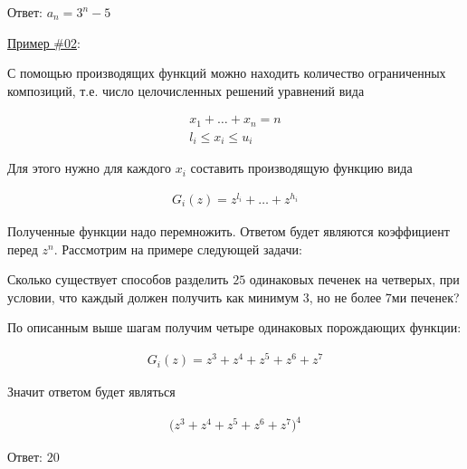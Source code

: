 Ответ: \(a_{n} = 3^{n} - 5\)

\underline{Пример \#02}:

С помощью производящих функций можно находить количество ограниченных
композиций, т.е. число целочисленных решений уравнений вида

\begin{align*}
  x_{1} + \dotsc + x_{n} = n \\
  l_{i} \le x_{i} \le u_{i}
\end{align*}

Для этого нужно для каждого \(x_{i}\) составить производящую функцию вида

\begin{align*}
  G_{i}(z) = z^{l_{i}} + \dotsc + z^{h_{i}}
\end{align*}

Полученные функции надо перемножить. Ответом будет являются коэффициент перед
\(z^{n}\). Рассмотрим на примере следующей задачи:

Сколько существует способов разделить \(25\) одинаковых печенек на четверых, при
условии, что каждый должен получить как минимум \(3\), но не более \(7\)ми
печенек?

По описанным выше шагам получим четыре одинаковых порождающих функции:

\begin{align*}
  G_{i}(z) = z^{3} + z^{4} + z^{5} + z^{6} + z^{7}
\end{align*}

Значит ответом будет являться

\begin{align*}
  [z^{25}] \Big( z^{3} + z^{4} + z^{5} + z^{6} + z^{7} \Big)^{4}
\end{align*}

Ответ: \(20\)


